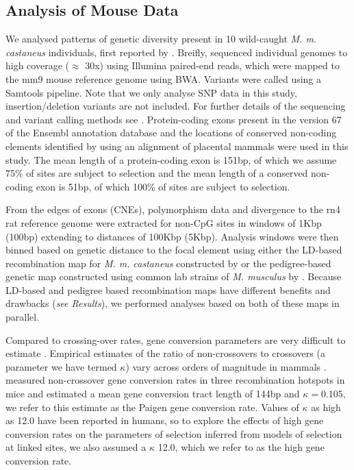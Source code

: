\documentclass[11pt]{article}
\begin{document}
	\subsection*{Analysis of Mouse Data}

	We analysed patterns of genetic diversity present in 10 wild-caught \textit{M. m. castaneus} individuals, first reported by \cite{RN122}. Breifly, \cite{RN122} sequenced individual genomes to high coverage ($\approx$ 30x) using Illumina paired-end reads, which were mapped to the mm9 mouse reference genome using BWA. Variants were called using a Samtools pipeline. Note that we only analyse SNP data in this study, insertion/deletion variants are not included. For further details of the sequencing and variant calling methods see \cite{RN122}. Protein-coding exons present in the version 67 of the Ensembl annotation database and the locations of conserved non-coding elements identified by \cite{RN122} using an alignment of placental mammals were used in this study. The mean length of a protein-coding exon is 151bp, of which we assume 75\% of sites are subject to selection and the mean length of a conserved non-coding exon is 51bp, of which 100\% of sites are subject to selection.

	From the edges of exons (CNEs), polymorphism data and divergence to the rn4 rat reference genome were extracted for non-CpG sites in windows of 1Kbp (100bp) extending to distances of 100Kbp (5Kbp). Analysis windows were then binned based on genetic distance to the focal element using either the LD-based recombination map for \textit{M. m. castaneus} constructed by \cite{RN340} or the pedigree-based genetic map constructed using common lab strains of \textit{M. musculus} by \cite{RN232}. Because LD-based and pedigree based recombination maps have different benefits and drawbacks (\textit{see Results}), we performed analyses based on both of these maps in parallel.

	Compared to crossing-over rates, gene conversion parameters are very difficult to estimate \citep{RN247}. Empirical estimates of the ratio of non-crossovers  to crossovers (a parameter we have termed $\kappa$) vary across orders of magnitude in mammals \citep{RN247}. \cite{RN263} measured non-crossover gene conversion rates in three recombination hotspots in mice and estimated a mean gene conversion tract length of 144bp and $\kappa = 0.105$, we refer to this estimate as the Paigen gene conversion rate. Values of $\kappa$ as high as 12.0 have been reported in humans, so to explore the effects of high gene conversion rates on the parameters of selection inferred from models of selection at linked sites, we also assumed a $\kappa$ 12.0, which we refer to as the high gene conversion rate. 
\end{document}
